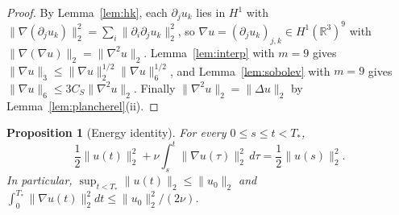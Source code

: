 \documentclass[11pt]{article}
\newtheorem{proposition}[theorem]{Proposition}
\theoremstyle{definition}
\theoremstyle{plain}
\newcommand{\R}{\mathbb R}
\newcommand{\norm}[1]{\lVert #1\rVert}
\begin{document}
\begin{proof}
By Lemma~\ref{lem:hk}, each $\partial_ju_k$ lies in $H^1$ with
$\|\nabla(\partial_ju_k)\|_2^2=\sum_i\|\partial_i\partial_ju_k\|_2^2$, so
$\nabla u=(\partial_ju_k)_{j,k}\in H^1(\R^3)^9$ with
$\|\nabla(\nabla u)\|_2=\|\nabla^2u\|_2$.  Lemma~\ref{lem:interp} with
$m=9$ gives $\|\nabla u\|_3\le\|\nabla u\|_2^{1/2}\|\nabla u\|_6^{1/2}$, and
Lemma~\ref{lem:sobolev} with $m=9$ gives
$\|\nabla u\|_6\le3C_S\|\nabla^2u\|_2$.  Finally
$\|\nabla^2u\|_2=\|\Delta u\|_2$ by Lemma~\ref{lem:plancherel}(ii).
\end{proof}

\begin{proposition}[Energy identity]\label{prop:energy}
For every $0\le s\le t<T_*$,
\begin{equation}\label{eq:energy}
 \frac12\norm{u(t)}_2^2
 +\nu\int_s^t\norm{\nabla u(\tau)}_2^2\,d\tau
 =\frac12\norm{u(s)}_2^2.
\end{equation}
In particular, $\sup_{t<T_*}\norm{u(t)}_2\le\norm{u_0}_2$ and
$\int_0^{T_*}\norm{\nabla u(t)}_2^2dt\le\norm{u_0}_2^2/(2\nu)$.
\end{proposition}
\end{document}
